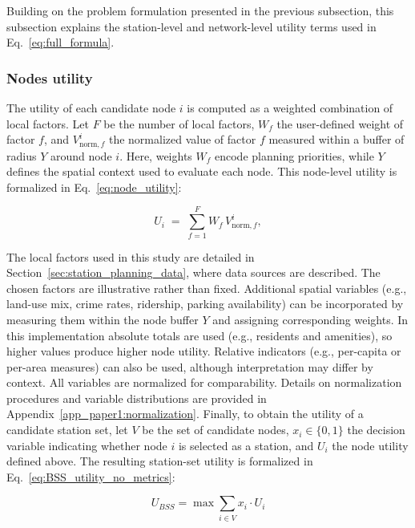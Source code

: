     Building on the problem formulation presented in the previous subsection, this subsection explains the station-level and network-level utility terms used in Eq.~\ref{eq:full_formula}. 

        \subsubsection{Nodes utility} \label{sec:section_nodes_utility}

        The utility of each candidate node \(i\) is computed as a weighted combination of local factors. Let \(F\) be the number of local factors, \(W_f\) the user-defined weight of factor \(f\), and \(V_{\mathrm{norm},f}^i\) the normalized value of factor \(f\) measured within a buffer of radius \(Y\) around node \(i\). Here, weights \(W_f\) encode planning priorities, while \(Y\) defines the spatial context used to evaluate each node. This node-level utility is formalized in Eq.~\ref{eq:node_utility}:

        \begin{equation} \label{eq:node_utility}
            U_i \;=\;\sum_{f=1}^F W_f\,V_{\mathrm{norm},f}^i,
        \end{equation}

        The local factors used in this study are detailed in Section~\ref{sec:station_planning_data}, where data sources are described. The chosen factors are illustrative rather than fixed. Additional spatial variables (e.g., land-use mix, crime rates, ridership, parking availability) can be incorporated by measuring them within the node buffer $Y$ and assigning corresponding weights. In this implementation absolute totals are used (e.g., residents and amenities), so higher values produce higher node utility. Relative indicators (e.g., per-capita or per-area measures) can also be used, although interpretation may differ by context. All variables are normalized for comparability. Details on normalization procedures and variable distributions are provided in Appendix~\ref{app_paper1:normalization}. Finally, to obtain the utility of a candidate station set, let \(V\) be the set of candidate nodes, \(x_i \in \{0,1\}\) the decision variable indicating whether node \(i\) is selected as a station, and \(U_i\) the node utility defined above. The resulting station-set utility is formalized in Eq.~\ref{eq:BSS_utility_no_metrics}:


        \begin{equation}\label{eq:BSS_utility_no_metrics}
                U_{BSS} = \max \sum_{i\in V} x_i \cdot U_i
        \end{equation}


